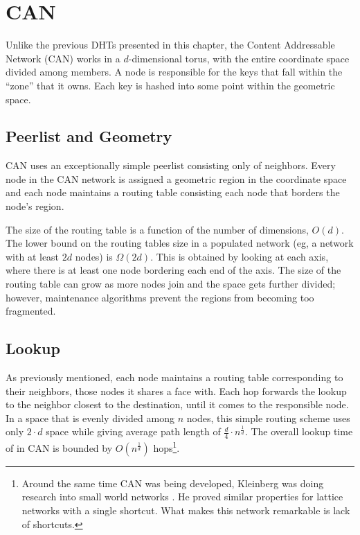 \section{CAN}


Unlike the previous DHTs presented in this chapter, the Content Addressable Network (CAN) \cite{can} works in a $d$-dimensional torus, with the entire coordinate space divided among members.
A node is responsible for the keys  that fall within the ``zone'' that it owns.
Each key is hashed into some point within the geometric space.

\subsection*{Peerlist and Geometry}
CAN uses an exceptionally simple peerlist consisting only of neighbors.  
Every node in the CAN network is assigned a geometric region in the coordinate space and each node maintains a routing table consisting each node that borders the node's region.

The size of the routing table is a function of the number of dimensions, $O(d)$. 
The lower bound on the routing tables size in a populated network (eg, a network with at least $2d$ nodes) is $\Omega(2d)$.  
This is obtained by looking at each axis, where there is at least one node bordering each end of the axis.
The size of the routing table can grow as more nodes join and the space gets further divided; however, maintenance algorithms prevent the regions from becoming too fragmented.


\subsection*{Lookup}
As previously mentioned, each node maintains a routing table corresponding to their neighbors, those nodes it shares a face with.
Each hop forwards the lookup to the neighbor closest to the destination, until it comes to the responsible node.
In a space that is evenly divided among $n$ nodes, this simple routing scheme uses only $2 \cdot d$ space while giving average path length of $\frac{d}{4}\cdot n^{\frac{1}{d}}$.
The overall lookup time of in CAN is bounded by $O(n^{\frac{1}{d}})$ hops\footnote{Around the same time CAN was being developed, Kleinberg was doing research into small world networks \cite{kleinberg2000small}.  
He proved similar properties for lattice networks with a single shortcut.  What makes this network remarkable is lack of shortcuts.}.

